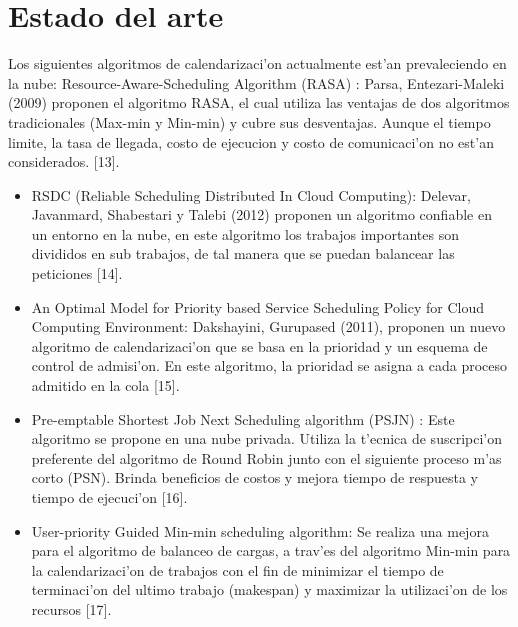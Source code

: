 \section*{Estado del arte}

Los siguientes algoritmos de calendarizaci'on actualmente est'an prevaleciendo en la nube:
Resource-Aware-Scheduling Algorithm (RASA) :  Parsa, Entezari-Maleki (2009) proponen el algoritmo RASA, el cual utiliza las ventajas de dos algoritmos tradicionales (Max-min y Min-min) y cubre sus desventajas. Aunque el tiempo limite, la tasa de llegada, costo de ejecucion y costo de comunicaci'on no est'an considerados. [13].

\begin{itemize}
\item RSDC (Reliable Scheduling Distributed In Cloud Computing): Delevar, Javanmard, Shabestari y Talebi (2012) proponen un algoritmo confiable en un entorno en la nube, en este algoritmo los trabajos importantes son divididos en sub trabajos, de tal manera que se puedan balancear las peticiones [14].


\item An Optimal Model for Priority based Service Scheduling Policy for Cloud Computing Environment: Dakshayini, Gurupased (2011), proponen un nuevo algoritmo de calendarizaci'on que se basa en la prioridad y un esquema de control de admisi'on. En este algoritmo, la prioridad se asigna a cada proceso admitido en la cola [15]. 


\item Pre-emptable Shortest Job Next Scheduling algorithm (PSJN) :  Este algoritmo se propone en una nube privada. Utiliza la t'ecnica de suscripci'on preferente del algoritmo de Round Robin junto con el siguiente proceso m'as corto (PSN). Brinda beneficios de costos y mejora tiempo de respuesta y tiempo de ejecuci'on [16]. 


\item User-priority Guided Min-min scheduling algorithm: Se realiza una mejora para el algoritmo de balanceo de cargas, a trav'es del algoritmo Min-min para la calendarizaci'on de trabajos con el fin de minimizar el tiempo de terminaci'on del ultimo trabajo (makespan) y maximizar la utilizaci'on de los recursos [17]. 
\end{itemize}



